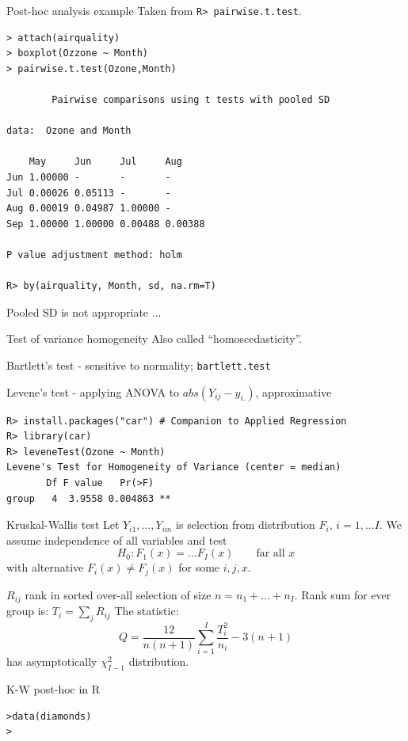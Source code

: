 \documentclass[smaller]{beamer}
\def\xskip{{\vspace{2ex}}}
\begin{document}
\begin{frame}[fragile]{Post-hoc analysis example}
Taken from \verb'R> pairwise.t.test'.
\begin{verbatim}
> attach(airquality)
> boxplot(Ozzone ~ Month)
> pairwise.t.test(Ozone,Month)

        Pairwise comparisons using t tests with pooled SD 

data:  Ozone and Month 

    May     Jun     Jul     Aug    
Jun 1.00000 -       -       -      
Jul 0.00026 0.05113 -       -      
Aug 0.00019 0.04987 1.00000 -      
Sep 1.00000 1.00000 0.00488 0.00388

P value adjustment method: holm 

R> by(airquality, Month, sd, na.rm=T)
\end{verbatim}
Pooled SD is not appropriate ...

\end{frame}


\begin{frame}[fragile]{Test of variance homogeneity}
Also called ``homoscedasticity''.

\xskip
Bartlett's test - sensitive to normality; \verb'bartlett.test'

\xskip
Levene's test - applying ANOVA to $abs(Y_{ij} - y_{i.})$, approximative

\begin{verbatim}
R> install.packages("car") # Companion to Applied Regression
R> library(car)
R> leveneTest(Ozone ~ Month) 
Levene's Test for Homogeneity of Variance (center = median)
       Df F value   Pr(>F)   
group   4  3.9558 0.004863 **
\end{verbatim}
\end{frame}

\begin{frame}{Kruskal-Wallis test}
Let $Y_{i1}, \dots, Y_{im}$ is selection from distribution $F_i$, $i=1,\dots I$. 
We assume independence of all variables and test 
\[
 H_0: F_1(x) = \dots F_I(x) \qquad \text{far all $x$}
\]
with alternative $F_i(x)\ne F_j(x)$ for some $i,j,x$.

\xskip
$R_{ij}$ rank in sorted over-all selection of size $n=n_1+\dots+n_I$.
Rank sum for ever group is: $T_i = \sum_j R_{ij}$
The statistic:
\[
 Q=\frac{12}{n(n+1)}\sum_{i=1}^I \frac{T_i^2}{n_i} - 3(n+1)
\]
has asymptotically $\chi^2_{I-1}$ distribution.
\end{frame}

\begin{frame}[fragile]{K-W post-hoc in R}
\begin{verbatim}
>data(diamonds)
>
\end{verbatim}

\end{frame}
\end{document}
